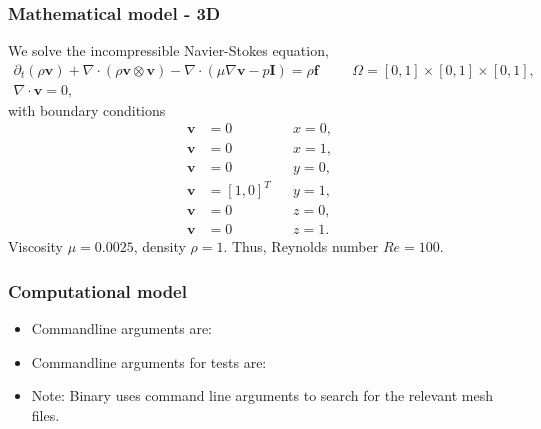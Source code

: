 \subsubsection{Mathematical model - 3D}
%
We solve the incompressible Navier-Stokes equation,
%
\begin{align}
    \partial_{t} (\rho \boldsymbol{v}) + \nabla \cdot (\rho \boldsymbol{v} \otimes \boldsymbol{v}) - \nabla \cdot (\mu \nabla \boldsymbol{v} - p \boldsymbol{I}) = \rho \boldsymbol{f} & &&\Omega = [0, 1] \times [0, 1] \times [0, 1], \\
    \nabla \cdot \boldsymbol{v} = 0,
\end{align}
%
with boundary conditions
%
\begin{align}
    \boldsymbol{v} &= 0         &&x = 0, \\
    \boldsymbol{v} &= 0         &&x = 1, \\
    \boldsymbol{v} &= 0         &&y = 0, \\
    \boldsymbol{v} &= [1, 0]^T  &&y = 1, \\
    \boldsymbol{v} &= 0         &&z = 0, \\
    \boldsymbol{v} &= 0         &&z = 1.
\end{align}
%
Viscosity $\mu = 0.0025$, density $\rho = 1$. Thus, Reynolds number $Re = 100$.
%
%
\subsubsection{Computational model}
%
\begin{itemize}
    \item{Commandline arguments are:}
    \item{Commandline arguments for tests are:}
    \item{Note: Binary uses command line arguments to search for the relevant mesh files.}
\end{itemize}
%
%
